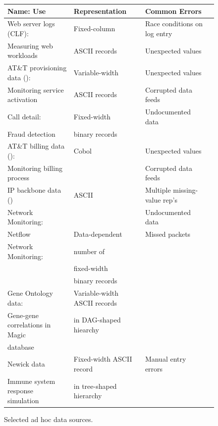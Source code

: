\documentclass{entcs}
\begin{document}
\begin{figure}
\begin{center}
\begin{tabular}{@{}|l|l|l|l|}
\hline
Name: Use                           & Representation    
           & Common Errors \\ \hline\hline
Web server logs (CLF):                & Fixed-column      
& Race conditions on log entry\\ 
Measuring web workloads               & ASCII records     
& Unexpected values\\ \hline
AT\&T provisioning data (\dibbler{}): & Variable-width    
& Unexpected values \\ 
Monitoring service activation         & ASCII records     
& Corrupted data feeds \\ \hline
Call detail:                   & Fixed-width       
&  Undocumented data\\
Fraud detection 
                                      & binary records  
& \\ \hline 
AT\&T billing data (\ningaui{}):      & Cobol  
& Unexpected values\\ 
Monitoring billing process   &                             
& Corrupted data feeds \\ \hline
IP backbone data (\darkstar{})  & ASCII  
& Multiple missing-value rep's \\
Network Monitoring:  &        
& Undocumented data \\ \hline
Netflow                               & Data-dependent      
& Missed packets\\ 
Network Monitoring:        & number of   
& \\
                                      & fixed-width 
& \\
                                      & binary records 
& \\ \hline
Gene Ontology data:        & Variable-width ASCII records 
&  \\
Gene-gene correlations in Magic & in DAG-shaped hiearchy 
& \\
database &
& \\\hline
Newick data                          & Fixed-width ASCII record 
& Manual entry errors \\
Immune system response simulation & in tree-shaped hierarchy 
& \\
\hline
\end{tabular}
\caption{Selected ad hoc data sources.}
\label{figure:data-sources}
\end{center}
\end{figure}
\end{document}
